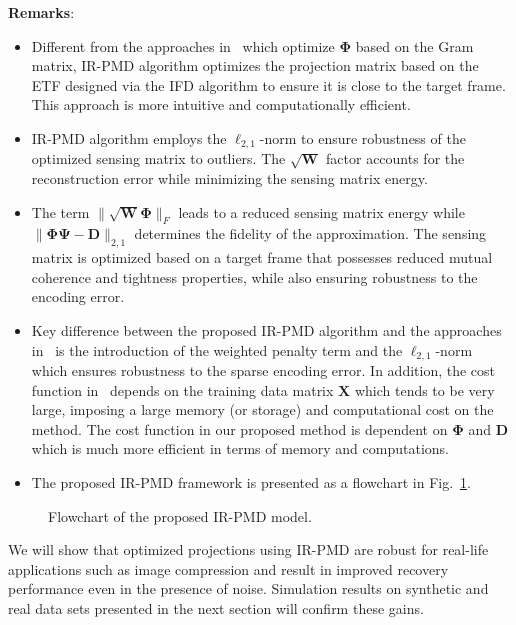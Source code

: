 
\noindent\textbf{Remarks}: 
\begin{itemize}
%
\item Different from the approaches in~\cite{HONG_robust,HONG_sparse} which optimize $\bm{\Phi}$ based on the Gram matrix, IR-PMD algorithm optimizes the projection matrix based on the ETF designed via the IFD algorithm to ensure it is close to the target frame. This approach is more intuitive and computationally efficient.
%
\item IR-PMD algorithm employs the $\ell_{2,1}$-norm to ensure robustness of the optimized sensing matrix to outliers. The $\sqrt{\bm{W}}$ factor accounts for the reconstruction error while minimizing the sensing matrix energy.
%
\item The term $\|\sqrt{\bm{W}}\bm{\Phi}\|_{F}$ leads to a reduced sensing matrix energy while $\|\bm{\Phi}\bm{\Psi}-\bm{D}\|_{2,1}$ determines the fidelity of the approximation. The sensing matrix is optimized based on a target frame that possesses reduced mutual coherence and tightness properties, while also ensuring robustness to the encoding error. 
%
\item Key difference between the proposed IR-PMD algorithm and the approaches in~\cite{SRE_Huang,HONG_sparse,HONG_robust} is the introduction of the weighted penalty term and the $\ell_{2,1}$-norm which ensures robustness to the sparse encoding error. In addition, the cost function in~\cite{SRE_Huang} depends on the training data matrix $\bm{X}$ which tends to be very large, imposing a large memory (or storage) and computational cost on the method. The cost function in our proposed method is dependent on $\bm{\Phi}$ and $\bm{D}$ which is much more efficient in terms of memory and computations.
%
\item  The proposed IR-PMD framework is presented as a flowchart in Fig.~\ref{Fig: IR_PMD_Flow chart}. 
\end{itemize}
%
%
\begin{figure}
\centering
\scalebox{.9}{}
\caption{Flowchart of the proposed IR-PMD model.}
\label{Fig: IR_PMD_Flow chart}
\end{figure}
%
We will show that optimized projections using IR-PMD are robust for real-life applications such as image compression and result in improved recovery performance even in the presence of noise. Simulation results on synthetic and real data sets presented in the next section will confirm these gains.
%

